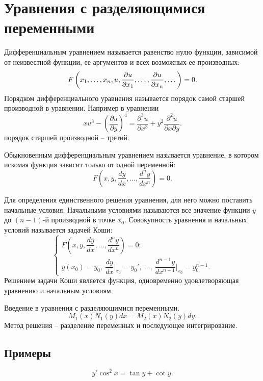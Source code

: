 \section{Уравнения с разделяющимися переменными}

    Дифференциальным уравнением называется равенство нулю функции, зависимой от неизвестной функции, ее аргументов и всех возможных ее производных:
    \[
        F \left( x_1, \dots, x_n, u, \dfrac{\partial u}{\partial x_1}, \dots, \dfrac{\partial u}{\partial x_n}, \dots \right) = 0.
    \]
    Порядком дифференциального уравнения называется порядок самой старшей производной в уравнении. Например в уравнении
    \[
        xu^3 - \left( \dfrac{\partial u}{\partial y} \right)^4 = \dfrac{\partial^3 u}{\partial x^3} + y^2 \dfrac{\partial^2 u}{\partial x \partial y}.
    \]
    порядок старшей производной -- третий.
    
    Обыкновенным дифференциальным уравнением называется уравнение, в котором искомая функция зависит только от одной переменной:
    \[
        F \left( x, y, \dfrac{dy}{dx}, \dots, \dfrac{d^ny}{dx^n} \right) = 0.
    \]

    Для определения единственного решения уравнения, для него можно поставить начальные условия. Начальными условиями называются все значение функции $ y $ до $ (n - 1) $-й производной в точке $ x_0 $. Совокупность уравнения и начальных условий называется задачей Коши:
    \[
        \begin{cases}
            F \left( x, y, \dfrac{dy}{dx}, \dots, \dfrac{d^ny}{dx^n} \right) = 0; \\
            y(x_0) = y_0, ~ \dfrac{dy}{dx} \Bigg|_{x_0} = y_0', ~ \dots, ~ \dfrac{d^{n - 1}y}{dx^{n - 1}} \Bigg|_{x_0} = y_0^{n - 1}.
        \end{cases}
    \]
    Решением задачи Коши является функция, одновременно удовлетворяющая уравнению и начальным условиям.
    
    Введение в уравнения с разделяющимися переменными.
    \[
        M_1(x) N_1(y) dx = M_2(x) N_2(y) dy.
    \]
    Метод решения -- разделение переменных и последующее интегрирование.

    \subsection{Примеры}
        \[
            y'\cos^2{x} = \tan{y} + \cot{y}.
        \]

